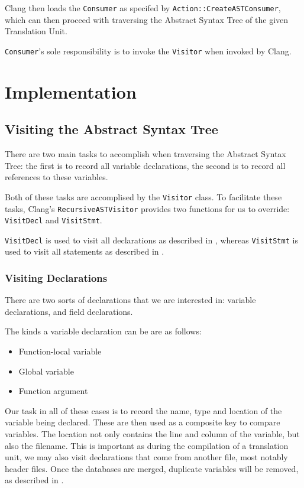Clang then loads the \lstinline|Consumer| as specifed by
\lstinline|Action::CreateASTConsumer|, which can then proceed with traversing
the Abstract Syntax Tree of the given Translation Unit.

\lstinline|Consumer|'s sole responsibility is to invoke the \lstinline|Visitor|
when invoked by Clang.

\section{Implementation}
\subsection{Visiting the Abstract Syntax Tree}

There are two main tasks to accomplish when traversing the Abstract Syntax Tree:
the first is to record all variable declarations, the second is to record all
references to these variables.

Both of these tasks are accomplised by the \lstinline|Visitor| class.
To facilitate these tasks, Clang's \lstinline|RecursiveASTVisitor| provides two
functions for us to override: \lstinline|VisitDecl| and \lstinline|VisitStmt|.

\lstinline|VisitDecl| is used to visit all declarations as described in
, whereas \lstinline|VisitStmt| is used to visit all
statements as described in .

\subsubsection{Visiting Declarations}
\label{sec:visitdecl}
There are two sorts of declarations that we are interested in: variable
declarations, and field declarations.

The kinds a variable declaration can be are as follows:
\begin{itemize}
	\item Function-local variable
	\item Global variable
	\item Function argument
\end{itemize}

Our task in all of these cases is to record the name, type and location of the
variable being declared. These are then used as a composite key to compare
variables. The location not only contains the line and column of the variable,
but also the filename. This is important as during the compilation of a
translation unit, we may also visit declarations that come from another file,
most notably header files. Once the databases are merged, duplicate variables
will be removed, as described in .

